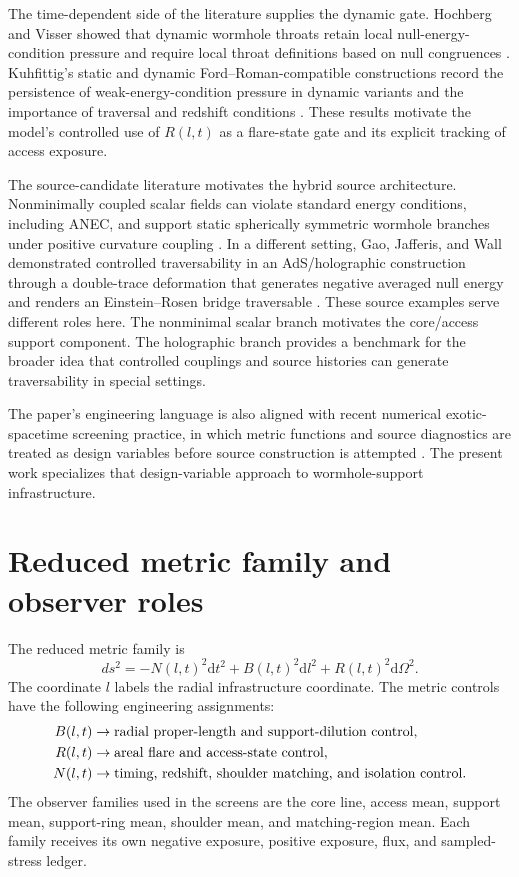 \documentclass[11pt]{article}
\newcommand{\dd}{\mathrm{d}}
\begin{document}
The time-dependent side of the literature supplies the dynamic gate.  Hochberg and Visser showed that dynamic wormhole throats retain local null-energy-condition pressure and require local throat definitions based on null congruences \citep{hochberg_visser_1998}.  Kuhfittig's static and dynamic Ford--Roman-compatible constructions record the persistence of weak-energy-condition pressure in dynamic variants and the importance of traversal and redshift conditions \citep{kuhfittig_2002}.  These results motivate the model's controlled use of $R(l,t)$ as a flare-state gate and its explicit tracking of access exposure.

The source-candidate literature motivates the hybrid source architecture.  Nonminimally coupled scalar fields can violate standard energy conditions, including ANEC, and support static spherically symmetric wormhole branches under positive curvature coupling \citep{barcelo_visser_2000}.  In a different setting, Gao, Jafferis, and Wall demonstrated controlled traversability in an AdS/holographic construction through a double-trace deformation that generates negative averaged null energy and renders an Einstein--Rosen bridge traversable \citep{gao_jafferis_wall_2017}.  These source examples serve different roles here.  The nonminimal scalar branch motivates the core/access support component.  The holographic branch provides a benchmark for the broader idea that controlled couplings and source histories can generate traversability in special settings.

The paper's engineering language is also aligned with recent numerical exotic-spacetime screening practice, in which metric functions and source diagnostics are treated as design variables before source construction is attempted \citep{bobrick_martire_2021}.  The present work specializes that design-variable approach to wormhole-support infrastructure.

\section{Reduced metric family and observer roles}

The reduced metric family is
\begin{equation}
 ds^2=-N(l,t)^2\dd t^2+B(l,t)^2\dd l^2+R(l,t)^2\dd\Omega^2.
 \label{eq:metric}
\end{equation}
The coordinate $l$ labels the radial infrastructure coordinate.  The metric controls have the following engineering assignments:
\begin{align}
 B(l,t)&\rightarrow\hbox{radial proper-length and support-dilution control},\nonumber\\
 R(l,t)&\rightarrow\hbox{areal flare and access-state control},\nonumber\\
 N(l,t)&\rightarrow\hbox{timing, redshift, shoulder matching, and isolation control}.\nonumber
\end{align}
The observer families used in the screens are the core line, access mean, support mean, support-ring mean, shoulder mean, and matching-region mean.  Each family receives its own negative exposure, positive exposure, flux, and sampled-stress ledger.
\end{document}
